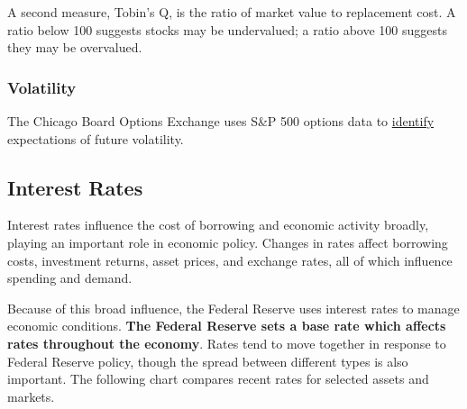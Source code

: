 \begin{minipage}{0.76\textwidth}
\small A second measure, Tobin's Q, is the ratio of market value to replacement cost. A ratio below 100 suggests stocks may be undervalued; a ratio above 100 suggests they may be overvalued.  
\vspace{3mm}

\hypertarget{capvol}{\label{capvol}}
\subsubsection*{Volatility}  
\small The Chicago Board Options Exchange uses S\&P 500 options data to \href{http://www.cboe.com/vix}{identify} expectations of future volatility. 
\vspace{1mm}

\vspace{2.9cm}

\hspace{5mm} 

\end{minipage}
\newpage
\hypertarget{intrts}{}
\subsection*{Interest Rates}
\begin{minipage}{0.76\textwidth}     
\hypertarget{capint}{\label{capint}}
\small Interest rates influence the cost of borrowing and economic activity broadly, playing an important role in economic policy. Changes in rates affect borrowing costs, investment returns, asset prices, and exchange rates, all of which influence spending and demand.

Because of this broad influence, the Federal Reserve uses interest rates to manage economic conditions. \textbf{The Federal Reserve sets a base rate which affects rates throughout the economy}. Rates tend to move together in response to Federal Reserve policy, though the spread between different types is also important. The following chart compares recent rates for selected assets and markets. 
\end{minipage}
\vspace{1.5mm}

